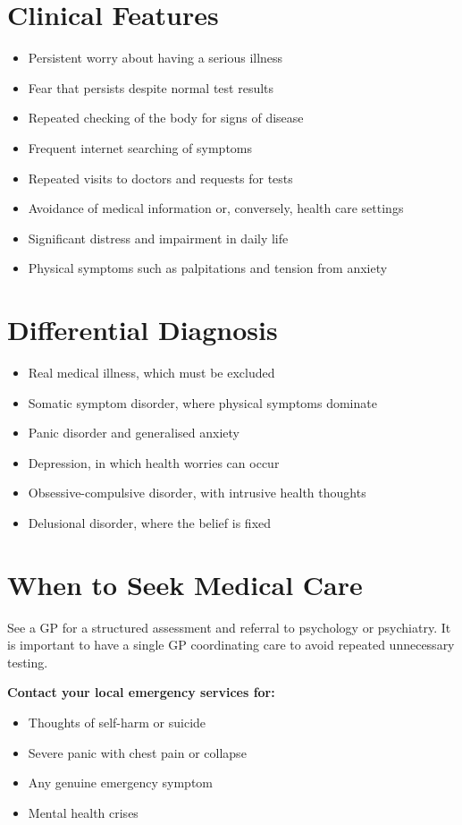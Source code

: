 \section*{Clinical Features}
\begin{itemize}
    \item Persistent worry about having a serious illness
    \item Fear that persists despite normal test results
    \item Repeated checking of the body for signs of disease
    \item Frequent internet searching of symptoms
    \item Repeated visits to doctors and requests for tests
    \item Avoidance of medical information or, conversely, health care settings
    \item Significant distress and impairment in daily life
    \item Physical symptoms such as palpitations and tension from anxiety
\end{itemize}

\section*{Differential Diagnosis}
\begin{itemize}
    \item Real medical illness, which must be excluded
    \item Somatic symptom disorder, where physical symptoms dominate
    \item Panic disorder and generalised anxiety
    \item Depression, in which health worries can occur
    \item Obsessive-compulsive disorder, with intrusive health thoughts
    \item Delusional disorder, where the belief is fixed
\end{itemize}

\section*{When to Seek Medical Care}
See a GP for a structured assessment and referral to psychology or psychiatry. It is important to have a single GP coordinating care to avoid repeated unnecessary testing.

\textbf{Contact your local emergency services for:}
\begin{itemize}
    \item Thoughts of self-harm or suicide
    \item Severe panic with chest pain or collapse
    \item Any genuine emergency symptom
    \item Mental health crises
\end{itemize}

